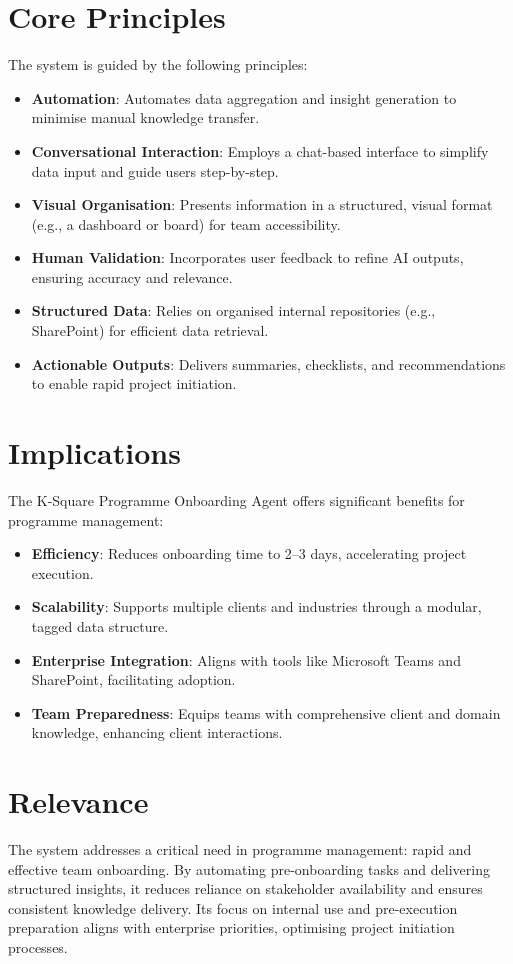 \documentclass{article}
\begin{document}
\section{Core Principles}
The system is guided by the following principles:
\begin{itemize}
    \item \textbf{Automation}: Automates data aggregation and insight generation to minimise manual knowledge transfer.
    \item \textbf{Conversational Interaction}: Employs a chat-based interface to simplify data input and guide users step-by-step.
    \item \textbf{Visual Organisation}: Presents information in a structured, visual format (e.g., a dashboard or board) for team accessibility.
    \item \textbf{Human Validation}: Incorporates user feedback to refine AI outputs, ensuring accuracy and relevance.
    \item \textbf{Structured Data}: Relies on organised internal repositories (e.g., SharePoint) for efficient data retrieval.
    \item \textbf{Actionable Outputs}: Delivers summaries, checklists, and recommendations to enable rapid project initiation.
\end{itemize}

\section{Implications}
The K-Square Programme Onboarding Agent offers significant benefits for programme management:
\begin{itemize}
    \item \textbf{Efficiency}: Reduces onboarding time to 2–3 days, accelerating project execution.
    \item \textbf{Scalability}: Supports multiple clients and industries through a modular, tagged data structure.
    \item \textbf{Enterprise Integration}: Aligns with tools like Microsoft Teams and SharePoint, facilitating adoption.
    \item \textbf{Team Preparedness}: Equips teams with comprehensive client and domain knowledge, enhancing client interactions.
\end{itemize}

\section{Relevance}
The system addresses a critical need in programme management: rapid and effective team onboarding. By automating pre-onboarding tasks and delivering structured insights, it reduces reliance on stakeholder availability and ensures consistent knowledge delivery. Its focus on internal use and pre-execution preparation aligns with enterprise priorities, optimising project initiation processes.
\end{document}
